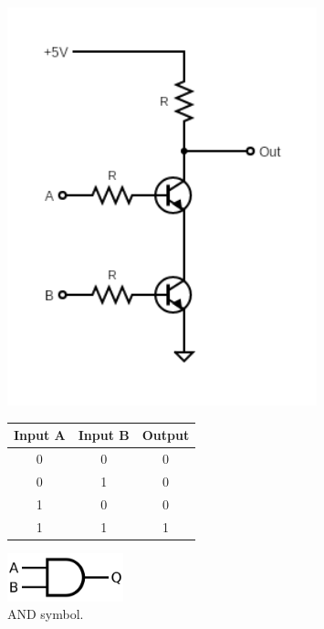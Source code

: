 	\begin{figure}[H]
		\begin{minipage}{0.5\textwidth}
			\centering
			\includegraphics[width=0.8\textwidth]{figures/circuits/AND.png}
			\label{fig:AND_circuit} 
		\end{minipage}
		\begin{minipage}{0.5\textwidth}
			\centering
			\begin{tabular}{|c|c|c|}
				\hline
				Input A & Input B & Output \\
				\hline
				0 & 0 & 0 \\
				0 & 1 & 0 \\
				1 & 0 & 0 \\
				1 & 1 & 1 \\
				\hline
			\end{tabular}
			\label{tab:AND_table}
		\end{minipage}
	\end{figure}

	\begin{figure}[H]
	    \centering
	    \includegraphics[width=0.3\textwidth]{figures/symbols/AND.png}
	    \caption{AND symbol.}
	    \label{fig:AND_sym} 
	\end{figure}


